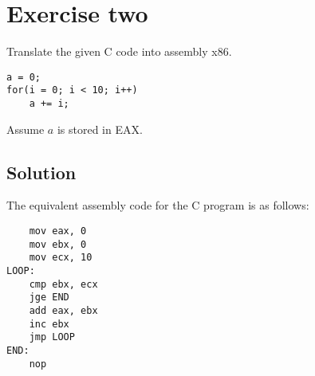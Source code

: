 \section{Exercise two}
Translate the given C code into assembly x86. 
\begin{verbatim}
a = 0;
for(i = 0; i < 10; i++)
    a += i;
\end{verbatim}
Assume $a$ is stored in EAX.

\subsection*{Solution}
The equivalent assembly code for the C program is as follows:
\begin{verbatim}
    mov eax, 0
    mov ebx, 0
    mov ecx, 10
LOOP:
    cmp ebx, ecx
    jge END
    add eax, ebx
    inc ebx
    jmp LOOP
END:
    nop
\end{verbatim}